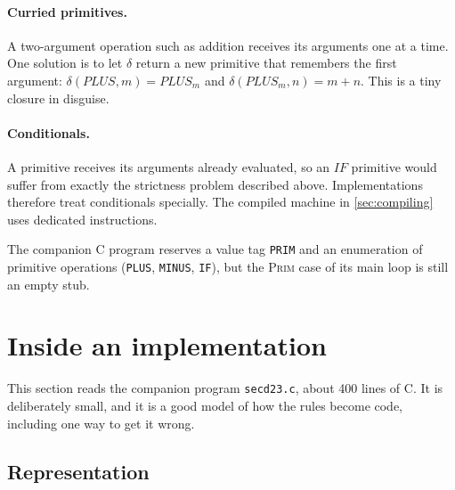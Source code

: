 \documentclass[11pt,a4paper]{article}
\newcommand{\rul}[1]{\textsc{#1}}
\theoremstyle{definition}
\theoremstyle{plain}
\begin{document}
\paragraph{Curried primitives.} A two-argument operation such as addition
receives its arguments one at a time. One solution is to let $\delta$ return a
new primitive that remembers the first argument:
$\delta(\mathit{PLUS}, m) = \mathit{PLUS}_m$ and
$\delta(\mathit{PLUS}_m, n) = m+n$. This is a tiny closure in disguise.

\paragraph{Conditionals.} A primitive receives its arguments already
evaluated, so an $\mathit{IF}$ primitive would suffer from exactly the strictness
problem described above. Implementations therefore treat conditionals
specially. The compiled machine in \cref{sec:compiling} uses dedicated
instructions.

The companion C program reserves a value tag \texttt{PRIM} and an enumeration
of primitive operations (\texttt{PLUS}, \texttt{MINUS}, \texttt{IF}), but the
\rul{Prim} case of its main loop is still an empty stub.

\section{Inside an implementation}\label{sec:implementation}

This section reads the companion program \texttt{secd23.c}, about 400 lines of
C. It is deliberately small, and it is a good model of how the rules
become code, including one way to get it wrong.

\subsection{Representation}
\end{document}
